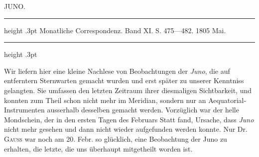 \par\bigskip
{}
\hypertarget{native-268-lower}{}
\begin{center}
\large JUNO.
\end{center}

\begin{center}
\parbox{.72\linewidth}{%
\centering\fontsize{8.2}{10.2}\selectfont
\hrule height .3pt\relax\vspace{2.5pt}
Monatliche Correspondenz. Band XI. S. 475—482. 1805 Mai.\par
\vspace{2.5pt}\hrule height .3pt\relax
}
\end{center}

\par\indent Wir liefern hier eine kleine Nachlese von Beobachtungen der \emph{Juno}, die auf entferntern Sternwarten gemacht wurden und erst später zu unserer Kenntniss gelangten. Sie umfassen den letzten Zeitraum ihrer diesmaligen Sichtbarkeit, und konnten zum Theil schon nicht mehr im Meridian, sondern nur an Aequatorial-Instrumenten ausserhalb desselben gemacht werden. Vorzüglich war der helle Mondschein, der in den ersten Tagen des Februars Statt fand, Ursache, dass \emph{Juno} nicht mehr gesehen und dann nicht wieder aufgefunden werden konnte. Nur Dr. \textsc{Gauss} war noch am 20. Febr. so glücklich, eine Beobachtung der Juno zu erhalten, die letzte, die uns überhaupt mitgetheilt worden ist.

